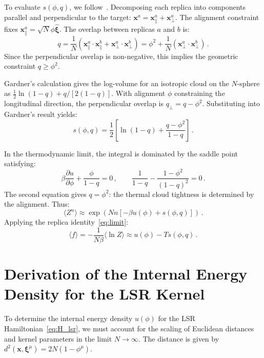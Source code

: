 \documentclass{article}
\theoremstyle{plain}
\theoremstyle{definition}
\theoremstyle{remark}
\begin{document}
To evaluate $s(\phi, q)$, we follow~\citet{gardner1988space}. Decomposing each replica into components parallel and perpendicular to the target: $\bm{x}^a = \bm{x}_\parallel^a + \bm{x}_\perp^a$. The alignment constraint fixes $\bm{x}_\parallel^a = \sqrt{N}\phi \hat{\bm{\xi}}$. The overlap between replicas $a$ and $b$ is:
\begin{equation}
    q = \frac{1}{N} \left( \bm{x}_\parallel^a \cdot \bm{x}_\parallel^b + \bm{x}_\perp^a \cdot \bm{x}_\perp^b \right) = \phi^2 + \frac{1}{N} \left( \bm{x}_\perp^a \cdot \bm{x}_\perp^b \right)\,.
\end{equation}
Since the perpendicular overlap is non-negative, this implies the geometric constraint $q \ge \phi^2$.

Gardner's calculation gives the log-volume for an isotropic cloud on the $N$-sphere as $\frac{1}{2}\ln(1-q) + q/[2(1-q)]$. With alignment $\phi$ constraining the longitudinal direction, the perpendicular overlap is $q_\perp = q - \phi^2$. Substituting into Gardner's result yields:
\begin{equation}
    s(\phi, q) = \frac{1}{2} \left[ \ln(1-q) + \frac{q - \phi^2}{1-q} \right]\,.
\end{equation}

In the thermodynamic limit, the integral is dominated by the saddle point satisfying:
\begin{equation}
    \beta \frac{\partial u}{\partial \phi} + \frac{\phi}{1-q} = 0\,,\qquad 
    \frac{1}{1-q} - \frac{1-\phi^2}{(1-q)^2} = 0\,.
\end{equation}
The second equation gives $q = \phi^2$: the thermal cloud tightness is determined by the alignment. Thus:
\begin{equation}
    \langle Z^n \rangle \approx \exp\left( N n [-\beta u(\phi) + s(\phi, q)] \right)\,.
\end{equation}
Applying the replica identity~\eqref{eq:limit}:
\begin{equation}
    \langle f \rangle = -\frac{1}{N\beta} \langle \ln Z \rangle 
    \approx u(\phi) - T s(\phi, q)\,.
\end{equation}




\section{Derivation of the Internal Energy Density for the LSR Kernel}

To determine the internal energy density $u(\phi)$ for the LSR Hamiltonian~\eqref{eq:H_lsr}, we must account for the scaling of Euclidean distances and kernel parameters in the limit $N \to \infty$. The distance is given by $d^2(\bm{x}, \bm{\xi}^\mu) = 2N(1 - \phi^\mu)$.
\end{document}
